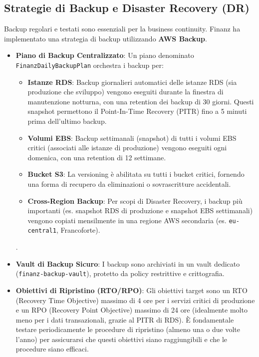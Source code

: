\subsection{Strategie di Backup e Disaster Recovery (DR)}
\label{subsec:backup-dr_cap2}
Backup regolari e testati sono essenziali per la business continuity. Finanz ha implementato una strategia di backup utilizzando \textbf{AWS Backup}.
\begin{itemize}
    \item \textbf{Piano di Backup Centralizzato}: Un piano denominato \texttt{Finanz\discretionary{-}{}{}Daily\discretionary{-}{}{}Backup\discretionary{-}{}{}Plan} orchestra i backup per: 
    \begin{itemize}
    \item \textbf{Istanze RDS}: Backup giornalieri automatici delle istanze RDS (sia produzione che sviluppo) vengono eseguiti durante la finestra di manutenzione notturna, con una retention dei backup di 30 giorni. Questi snapshot permettono il Point-In-Time Recovery (PITR) fino a 5 minuti prima dell'ultimo backup.
            \item \textbf{Volumi EBS}: Backup settimanali (snapshot) di tutti i volumi EBS critici (associati alle istanze di produzione) vengono eseguiti ogni domenica, con una retention di 12 settimane.
            \item \textbf{Bucket S3}: La versioning è abilitata su tutti i bucket critici, fornendo una forma di recupero da eliminazioni o sovrascritture accidentali. 
            \item \textbf{Cross-Region Backup}: Per scopi di Disaster Recovery, i backup più importanti (es. snapshot RDS di produzione e snapshot EBS settimanali) vengono copiati mensilmente in una regione AWS secondaria (es. \texttt{eu-central\discretionary{-}{}{-}1}, Francoforte).
        \end{itemize}.
    \item \textbf{Vault di Backup Sicuro}: I backup sono archiviati in un vault dedicato (\texttt{finanz-backup-vault}), protetto da policy restrittive e crittografia.
    \item \textbf{Obiettivi di Ripristino (RTO/RPO)}: Gli obiettivi target sono un RTO (Recovery Time Objective) massimo di 4 ore per i servizi critici di produzione e un RPO (Recovery Point Objective) massimo di 24 ore (idealmente molto meno per i dati transazionali, grazie al PITR di RDS). È fondamentale testare periodicamente le procedure di ripristino (almeno una o due volte l'anno) per assicurarsi che questi obiettivi siano raggiungibili e che le procedure siano efficaci.
\end{itemize}

